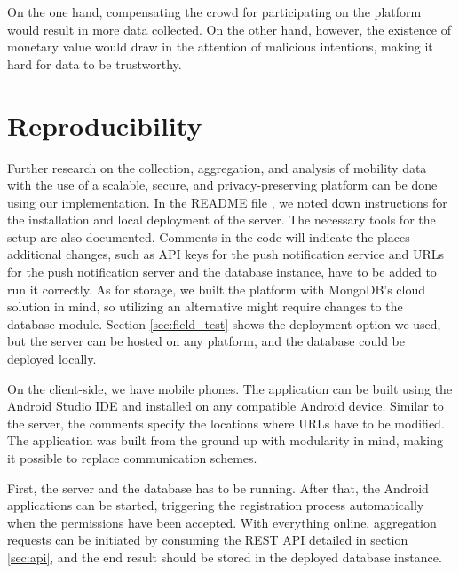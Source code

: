 On the one hand, compensating the crowd for participating on the platform would result in more data collected. On the other hand, however, the existence of monetary value would draw in the attention of malicious intentions, making it hard for data to be trustworthy.

\section{Reproducibility}
Further research on the collection, aggregation, and analysis of mobility data with the use of a scalable, secure, and privacy-preserving platform can be done using our implementation. In the README file
, we noted down instructions for the installation and local deployment of the server. The necessary tools for the setup are also documented. Comments in the code will indicate the places additional changes, such as API keys for the push notification service and URLs for the push notification server and the database instance, have to be added to run it correctly. As for storage, we built the platform with MongoDB's cloud solution in mind, so utilizing an alternative might require changes to the database module. Section \ref{sec:field_test} shows the deployment option we used, but the server can be hosted on any platform, and the database could be deployed locally.

On the client-side, we have mobile phones. The application can be built using the Android Studio IDE and installed on any compatible Android device. Similar to the server, the comments specify the locations where URLs have to be modified. The application was built from the ground up with modularity in mind, making it possible to replace communication schemes.

First, the server and the database has to be running. After that, the Android applications can be started, triggering the registration process automatically when the permissions have been accepted. With everything online, aggregation requests can be initiated by consuming the REST API detailed in section \ref{sec:api}, and the end result should be stored in the deployed database instance.